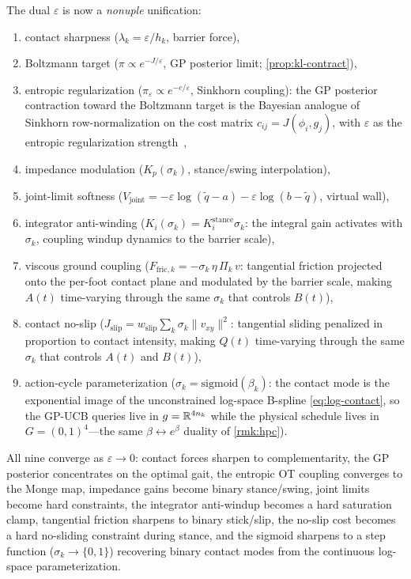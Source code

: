 The dual $\varepsilon$ is now a \emph{nonuple} unification:
\begin{enumerate}[nosep]
\item contact sharpness ($\lambda_k = \varepsilon/h_k$, barrier force),
\item Boltzmann target ($\pi \propto e^{-J/\varepsilon}$,
      GP posterior limit; \cref{prop:kl-contract}),
\item entropic regularization ($\pi_\varepsilon \propto e^{-c/\varepsilon}$,
      Sinkhorn coupling): the GP posterior contraction toward the
      Boltzmann target is the Bayesian analogue of Sinkhorn
      row-normalization on the cost matrix
      $c_{ij} = J(\phi_i, g_j)$, with $\varepsilon$ as the
      entropic regularization strength~\cite{Cuturi2013},
\item impedance modulation ($K_p(\sigma_k)$, stance/swing interpolation),
\item joint-limit softness ($V_{\mathrm{joint}} = -\varepsilon\log(\tilde{q}-a)
      - \varepsilon\log(b-\tilde{q})$, virtual wall),
\item integrator anti-winding ($K_i(\sigma_k) = K_i^{\mathrm{stance}}\sigma_k$:
      the integral gain activates with $\sigma_k$, coupling windup
      dynamics to the barrier scale),
\item viscous ground coupling ($F_{\mathrm{fric},k} = -\sigma_k\,\eta\,\Pi_k\,v$:
      tangential friction projected onto the per-foot contact plane
      and modulated by the barrier scale, making $A(t)$ time-varying
      through the same $\sigma_k$ that controls $B(t)$),
\item contact no-slip ($J_{\mathrm{slip}} = w_{\mathrm{slip}} \sum_k
      \sigma_k \|v_{xy}\|^2$: tangential sliding penalized in proportion
      to contact intensity, making $Q(t)$ time-varying through the same
      $\sigma_k$ that controls $A(t)$ and $B(t)$),
\item action-cycle parameterization ($\sigma_k = \mathrm{sigmoid}(\beta_k)$:
      the contact mode is the exponential image of the unconstrained
      log-space B-spline \eqref{eq:log-contact}, so the GP-UCB queries live
      in $g = \mathbb{R}^{4n_k}$ while the physical schedule lives in
      $G = (0,1)^4$---the same $\beta \leftrightarrow e^\beta$ duality
      of \cref{rmk:hpc}).
\end{enumerate}
All nine converge as $\varepsilon \to 0$: contact forces sharpen to
complementarity, the GP posterior concentrates on the optimal gait,
the entropic OT coupling converges to the Monge map,
impedance gains become binary stance/swing,
joint limits become hard constraints,
the integrator anti-windup becomes a hard saturation clamp,
tangential friction sharpens to binary stick/slip,
the no-slip cost becomes a hard no-sliding constraint during stance,
and the sigmoid sharpens to a step function ($\sigma_k \to \{0,1\}$)
recovering binary contact modes from the continuous log-space
parameterization.

